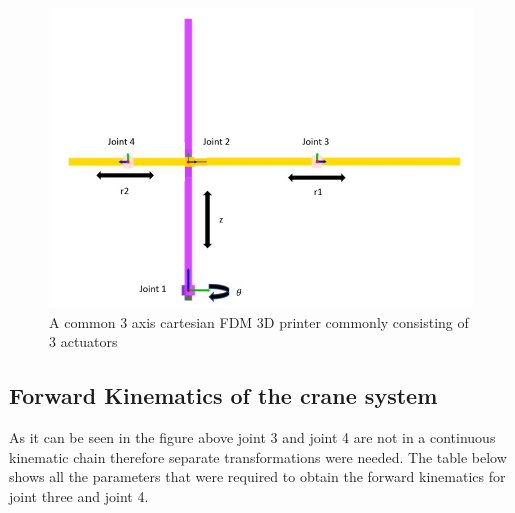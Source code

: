 \documentclass{UoNMCHA}
\numberwithin{equation}{section}
\begin{document}
	\begin{figure}[H]
		\begin{center}
			\includegraphics[width=.8\linewidth]{figs/Picture6}
			\caption{A  common 3 axis cartesian FDM 3D printer commonly consisting of 3 actuators}
			\label{figs/Picture6}
		\end{center}
	\end{figure}
	
	\subsection{Forward Kinematics of the crane system}
	
	As it can be seen in the figure above joint 3 and joint 4 are not in a continuous kinematic chain therefore separate transformations were needed.  The table below shows all the parameters that were required to obtain the forward kinematics for joint three and joint 4.
	
\end{document}
